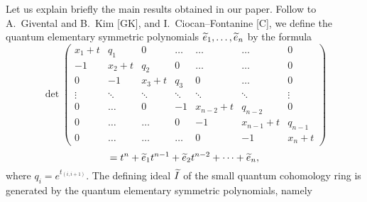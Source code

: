Let us explain briefly the main results obtained in our paper. 
Follow to A.~Givental and B.~Kim [GK], and 
I.~Ciocan--Fontanine [C], we define the 
quantum elementary symmetric polynomials 
$\widetilde e_1,\ldots ,\widetilde e_n$ by the formula 
$$ \det\left(\begin{array}{ccccccc} x_1+t & q_1&0 &\ldots &\ldots 
&\ldots &0\\
-1 & x_2+t & q_2 &0 &\ldots &\ldots & 0\\
0 & -1 &x_3+t & q_3 & 0 &\ldots & 0 \\
\vdots &\ddots &\ddots & \ddots &\ddots &\ddots &\vdots \\
0&\ldots & 0 &-1&x_{n-2}+t &q_{n-2} & 0 \\
0 &\ldots &\ldots & 0 &-1 & x_{n-1}+t & q_{n-1}\\
0 &  \ldots &\ldots &\ldots & 0 & -1 & x_n+t
\end{array}\right) 
$$ 
$$= t^n + \widetilde e_1t^{n-1} + \widetilde e_2t^{n-2}+\cdots +\widetilde e_{n},
$$  
where $q_i = e^{t_{(i,i+1)}}.$ The defining ideal $\widetilde I$ of the 
small quantum cohomology ring is generated by the 
quantum elementary symmetric polynomials, namely 
